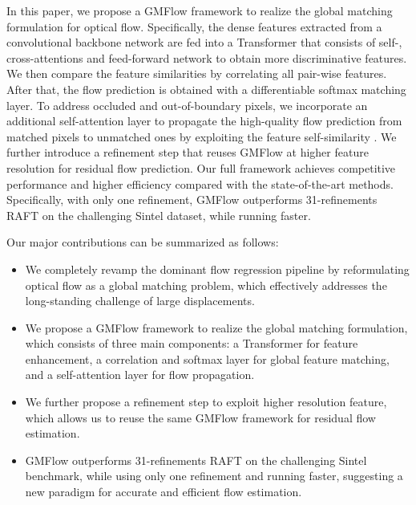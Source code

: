 \documentclass[10pt,twocolumn,letterpaper]{article}
\begin{document}
In this paper, we propose a GMFlow framework to realize the global matching formulation for optical flow. Specifically, the dense features extracted from a convolutional backbone network are fed into a Transformer that consists of self-, cross-attentions and feed-forward network to obtain more discriminative features. We then compare the feature similarities by correlating all pair-wise features.
After that, the flow prediction is obtained with a differentiable softmax matching layer. 
To address occluded and out-of-boundary pixels, we incorporate an additional self-attention layer to propagate the high-quality flow prediction from matched pixels to unmatched ones by exploiting the feature self-similarity \cite{hui2020liteflownet3,Jiang_2021_ICCV}. We further introduce a refinement step that reuses GMFlow at higher feature resolution for residual flow prediction. Our full framework achieves competitive performance and higher efficiency compared with the state-of-the-art methods. Specifically, with only one refinement, GMFlow outperforms 31-refinements RAFT on the challenging Sintel \cite{butler2012naturalistic} dataset, while running faster.





























Our major contributions can be summarized as follows:
\begin{itemize}
	\vspace{-8pt}
	\item We completely revamp the dominant flow regression pipeline by reformulating optical flow as a global matching problem, which effectively addresses the long-standing challenge of large displacements.
	\vspace{-8pt}
	\item We propose a GMFlow framework to realize the global matching formulation, which consists of three main components: a Transformer for feature enhancement, a correlation and softmax layer for global feature matching, and a self-attention layer for flow propagation.
	\vspace{-8pt}
	\item We further propose a refinement step to exploit higher resolution feature, which allows us to reuse the same GMFlow framework for residual flow estimation.
	\vspace{-8pt}
	\item GMFlow outperforms 31-refinements RAFT on the challenging Sintel benchmark, while using only one refinement and running faster, suggesting a new paradigm for accurate and efficient flow estimation.
	\vspace{-8pt}
\end{itemize}
\end{document}
